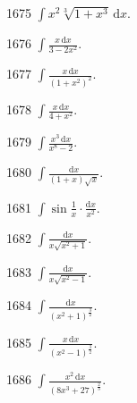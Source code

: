 \begin{prob}[S]{1675}
$\displaystyle\int x^2\sqrt[3]{1 + x^3}\,\mathrm{d}x.$
\end{prob}

\begin{prob}[S]{1676}
$\displaystyle\int \frac{x\,\mathrm{d}x}{3 - 2x^2}.$
\end{prob}

\begin{prob}[S]{1677}
$\displaystyle\int \frac{x\,\mathrm{d}x}{(1 + x^2)^2}.$
\end{prob}

\begin{prob}[S]{1678}
$\displaystyle\int \frac{x\,\mathrm{d}x}{4 + x^2}.$
\end{prob}

\begin{prob}[S]{1679}
$\displaystyle\int \frac{x^3\,\mathrm{d}x}{x^8 - 2}.$
\end{prob}

\begin{prob}[S]{1680}
$\displaystyle\int \frac{\mathrm{d}x}{(1 + x)\sqrt{x}}.$
\end{prob}

\begin{prob}[S]{1681}
$\displaystyle\int \sin\frac{1}{x} \cdot \frac{\mathrm{d}x}{x^2}.$
\end{prob}

\begin{prob}[S]{1682}
$\displaystyle\int \frac{\mathrm{d}x}{x\sqrt{x^2 + 1}}.$
\end{prob}

\begin{prob}[S]{1683}
$\displaystyle\int \frac{\mathrm{d}x}{x\sqrt{x^2 - 1}}.$
\end{prob}

\begin{prob}[S]{1684}
$\displaystyle\int \frac{\mathrm{d}x}{(x^2 + 1)^{\frac{3}{2}}}.$
\end{prob}

\begin{prob}[S]{1685}
$\displaystyle\int \frac{x\,\mathrm{d}x}{(x^2 - 1)^{\frac{3}{2}}}.$
\end{prob}

\begin{prob}[S]{1686}
$\displaystyle\int \frac{x^2\,\mathrm{d}x}{(8x^3 + 27)^{\frac{2}{3}}}.$
\end{prob}


